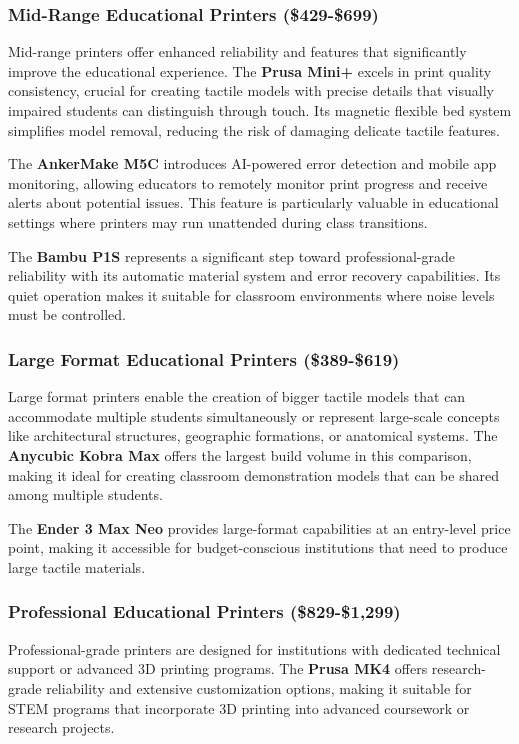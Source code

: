 \subsubsection{Mid-Range Educational Printers (\$429-\$699)}
Mid-range printers offer enhanced reliability and features that significantly improve the educational experience. The \textbf{Prusa Mini+} excels in print quality consistency, crucial for creating tactile models with precise details that visually impaired students can distinguish through touch. Its magnetic flexible bed system simplifies model removal, reducing the risk of damaging delicate tactile features.

The \textbf{AnkerMake M5C} introduces AI-powered error detection and mobile app monitoring, allowing educators to remotely monitor print progress and receive alerts about potential issues. This feature is particularly valuable in educational settings where printers may run unattended during class transitions.

The \textbf{Bambu P1S} represents a significant step toward professional-grade reliability with its automatic material system and error recovery capabilities. Its quiet operation makes it suitable for classroom environments where noise levels must be controlled.

\subsubsection{Large Format Educational Printers (\$389-\$619)}
Large format printers enable the creation of bigger tactile models that can accommodate multiple students simultaneously or represent large-scale concepts like architectural structures, geographic formations, or anatomical systems. The \textbf{Anycubic Kobra Max} offers the largest build volume in this comparison, making it ideal for creating classroom demonstration models that can be shared among multiple students.

The \textbf{Ender 3 Max Neo} provides large-format capabilities at an entry-level price point, making it accessible for budget-conscious institutions that need to produce large tactile materials.

\subsubsection{Professional Educational Printers (\$829-\$1,299)}
Professional-grade printers are designed for institutions with dedicated technical support or advanced 3D printing programs. The \textbf{Prusa MK4} offers research-grade reliability and extensive customization options, making it suitable for STEM programs that incorporate 3D printing into advanced coursework or research projects.


